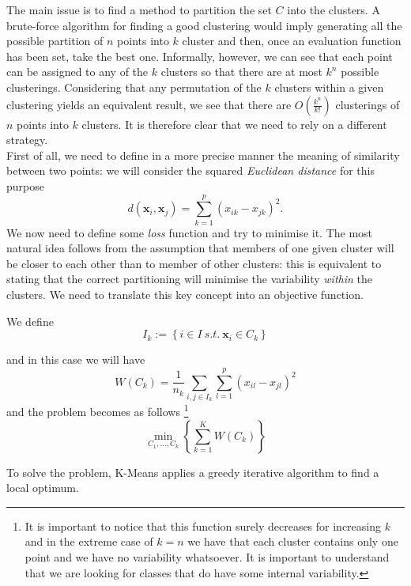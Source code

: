 \documentclass[a4paper]{article}
\begin{document}
	The main issue is to find a method to partition the set $C$ into
	the clusters. A brute-force algorithm for finding a good clustering would imply generating all the possible partition of $n$ points into $k$ cluster and then, once an evaluation function has been set, take the best one. Informally, however, we can see that each point can be assigned to any of the $k$ clusters so that there are at most $k^{n}$ possible clusterings. Considering that any permutation of the $k$ clusters within a given clustering yields an equivalent result, we see that there are $O(\frac{k^{n}}{k!})$ clusterings of $n$ points into $k$ clusters. It is therefore clear that we need to rely on a different strategy.\\


	First of all, we need to define in a more precise manner
	the meaning of similarity between two points: we will consider the squared \textsl{Euclidean
		distance} for this purpose
	$$
	d(\boldsymbol{x}_{i},\boldsymbol{x}_{j})= \sum_{k = 1}^{p} \left( x_{ik} - x_{jk}
	\right)^{2}.
	$$
	We now need to define some \textsl{loss} function and try to minimise
	it. The most natural idea follows from the assumption that members
	of one given cluster will be closer to each other than to member of
	other clusters: this is equivalent to stating that the correct partitioning
	will minimise the variability \textsl{within} the clusters. We need
	to translate this key concept into an objective function.

	We define
	$$
	I_{k}:=\left\{ i\in I\:s.t.\:\boldsymbol{x}_{i}\in C_{k}\right\}
	$$

	and in this case we will have
	$$
	W(C_{k}) = \frac{1}{n_{k}} \underset{i,j\in I_{k}}{\sum} \sum_{l=1}^{p} \left(x_{il}-x_{jl}\right)^{2}
	$$
	and the problem becomes as follows
	\footnote{It is important to notice that this function surely decreases for
		increasing $k$ and in the extreme case of $k=n$ we have that each
		cluster contains only one point and we have no variability whatsoever.
		It is important to understand that we are looking for classes that
		do have some internal variability.}
	$$	\underset{C_{1},\ldots,C_{k}}{\min}\left\{ \sum_{k=1}^{K}W(C_{k})\right\} $$


	To solve the problem, K-Means applies a greedy iterative algorithm to find a local optimum.
\end{document}
